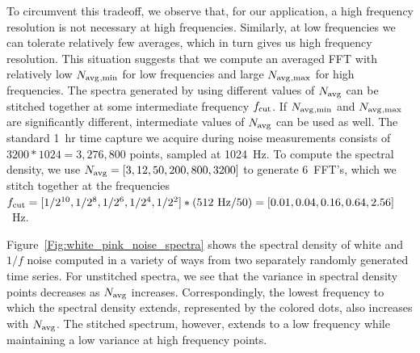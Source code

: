 To circumvent this tradeoff, we observe that, for our application, a high frequency resolution is not necessary at high frequencies. Similarly, at low frequencies we can tolerate relatively few averages, which in turn gives us high frequency resolution. This situation suggests that we compute an averaged FFT with relatively low $N_\text{avg}{}_\text{,min}$ for low frequencies and large $N_\text{avg}{}_\text{,max}$ for high frequencies. The spectra generated by using different values of $N_\text{avg}{}$ can be stitched together at some intermediate frequency $f_\text{cut}{}$. If $N_\text{avg}{}_\text{,min}$ and $N_\text{avg}{}_\text{,max}$ are significantly different, intermediate values of $N_\text{avg}{}$ can be used as well. The standard 1~hr time capture we acquire during noise measurements consists of $3200*1024 = 3,276,800$ points, sampled at 1024~Hz. To compute the spectral density, we use $N_\text{avg}{} = [3, 12, 50, 200, 800, 3200]$ to generate 6~FFT's, which we stitch together at the frequencies $f_\text{cut}{} = [1/2^{10}, 1/2^8, 1/2^6, 1/2^4, 1/2^2]*(512~\text{Hz}/50) = [0.01, 0.04, 0.16, 0.64, 2.56]$~Hz.

Figure~\ref{Fig:white_pink_noise_spectra} shows the spectral density of white and $1/f$ noise computed in a variety of ways from two separately randomly generated time series. For unstitched spectra, we see that the variance in spectral density points decreases as $N_\text{avg}{}$ increases. Correspondingly, the lowest frequency to which the spectral density extends, represented by the colored dots, also increases with $N_\text{avg}{}$. The stitched spectrum, however, extends to a low frequency while maintaining a low variance at high frequency points.

